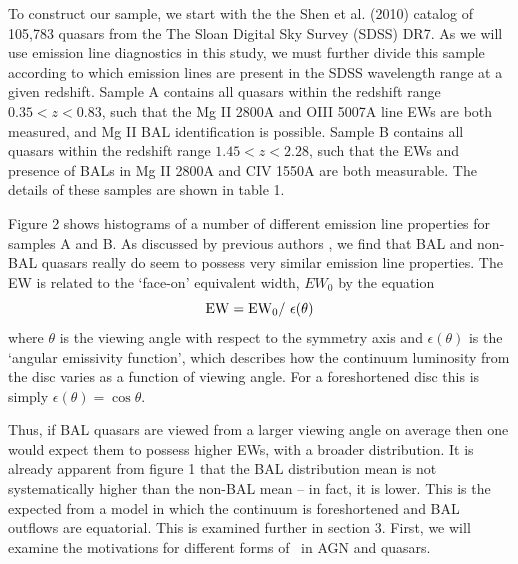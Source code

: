 
To construct our sample, we start with the the Shen et al. (2010) catalog of
105,783 quasars from the The Sloan Digital Sky Survey (SDSS) DR7. 
As we will use emission line diagnostics in this study, we must further divide
this sample  according to which emission lines are present in 
the SDSS wavelength range at a given redshift. 
Sample A contains all quasars within the redshift range $0.35<z<0.83$, 
such that the Mg II 2800A and OIII 5007A line EWs are both measured, and Mg II BAL identification
is possible.  Sample B contains all quasars within the redshift range $1.45<z<2.28$, such that 
the EWs and presence of BALs in Mg II 2800A and CIV 1550A are both measurable.
The details of these samples are shown in table 1.

Figure 2 shows histograms of a number of different 
emission line properties for samples A and B. 
As discussed by previous authors \cite[e.g.][]{weymann1991}, we find that BAL
and non-BAL quasars really do seem to possess very similar emission line 
properties. The EW is related to the `face-on' equivalent width,
$EW_0$ by the equation
\begin{equation}
{\rm EW} = {\rm EW}_0 /~\epsilon(\theta)
\end{equation}
where $\theta$ is the viewing angle with respect to the symmetry axis 
and $\epsilon(\theta)$ is the `angular emissivity function', which describes 
how the continuum luminosity from the disc varies as a function of viewing angle.
For a foreshortened disc this is simply $\epsilon(\theta) = \cos \theta$.

Thus, if BAL quasars are viewed from a larger viewing angle on average then one
would expect them to possess higher EWs, with a broader distribution.
It is already apparent from figure 1 that the BAL distribution mean 
is not systematically higher than the non-BAL
mean -- in fact, it is lower. This is the expected from a model
in which the continuum is foreshortened and BAL outflows are equatorial.
This is examined further in section 3. First, we will examine the motivations
for different forms of \ept\ in AGN and quasars.

